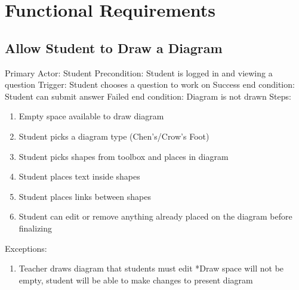 \section{Functional Requirements}
    \subsection{Allow Student to Draw a Diagram}
        Primary Actor: Student \newline
        Precondition: Student is logged in and viewing a            question \newline
        Trigger: Student chooses a question to work on \newline
        Success end condition: Student can submit answer            \newline
        Failed end condition: Diagram is not drawn \newline
        \newline
        Steps:
        \begin{enumerate}
            \item{Empty space available to draw diagram}
            \item{Student picks a diagram type (Chen’s/Crow’s Foot)}
            \item{Student picks shapes from toolbox and places in           diagram}
            \item{Student places text inside shapes}
            \item{Student places links between shapes}
            \item{Student can edit or remove anything already placed on the diagram before finalizing}
        \end{enumerate}
        Exceptions:
        \begin{enumerate}
            \item{Teacher draws diagram that students must edit             \newline
                *Draw space will not be empty, student will be able to           make changes to present diagram}
        \end{enumerate}

    
